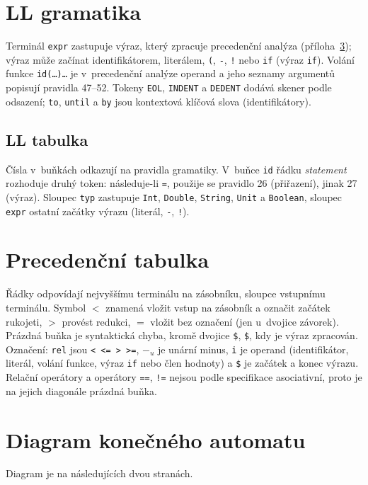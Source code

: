 \documentclass[11pt,a4paper]{article}
\newcommand{\T}[1]{\texttt{#1}}
\begin{document}
\appendix
\newpage
\section{LL gramatika}\label{app:ll}
Terminál \T{expr} zastupuje výraz, který zpracuje precedenční analýza
(příloha~\ref{app:prec}); výraz může začínat identifikátorem, literálem,
\T{(}, \T{-}, \T{!} nebo \T{if} (výraz \T{if}). Volání funkce
\T{id(\dots)\dots} je v~precedenční analýze operand a jeho seznamy argumentů
popisují pravidla 47--52. Tokeny \T{EOL}, \T{INDENT} a \T{DEDENT} dodává
skener podle odsazení; \T{to}, \T{until} a \T{by} jsou kontextová klíčová
slova (identifikátory).

{\small

}

\begin{landscape}
\section{LL tabulka}\label{app:lltab}
Čísla v~buňkách odkazují na pravidla gramatiky. V~buňce \T{id} řádku
\textit{statement} rozhoduje druhý token: následuje-li \T{=}, použije se
pravidlo 26 (přiřazení), jinak 27 (výraz). Sloupec \T{typ} zastupuje
\T{Int}, \T{Double}, \T{String}, \T{Unit} a \T{Boolean}, sloupec
\T{expr} ostatní začátky výrazu (literál, \T{-}, \T{!}).

\begin{center}
{\small

}
\end{center}
\end{landscape}

\section{Precedenční tabulka}\label{app:prec}
Řádky odpovídají nejvyššímu terminálu na zásobníku, sloupce vstupnímu
terminálu. Symbol $<$ znamená vložit vstup na zásobník a označit začátek
rukojeti, $>$ provést redukci, $=$ vložit bez označení (jen u~dvojice
závorek). Prázdná buňka je syntaktická chyba, kromě dvojice \texttt{\$},
\texttt{\$}, kdy je výraz zpracován. Označení: \texttt{rel} jsou
\texttt{< <= > >=}, $-_u$ je unární minus, \texttt{i} je operand
(identifikátor, literál, volání funkce, výraz \texttt{if} nebo člen
hodnoty) a \texttt{\$} je začátek a konec výrazu. Relační operátory
a operátory \texttt{==}, \texttt{!=} nejsou podle specifikace asociativní,
proto je na jejich diagonále prázdná buňka.

\begin{center}

\end{center}

\section{Diagram konečného automatu}\label{app:fsm}
Diagram je na následujících dvou stranách.

\end{document}
